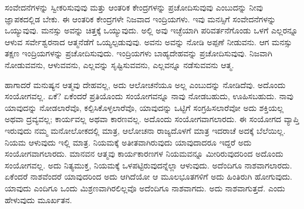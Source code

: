 ಸಂವೇದನೆಗಳನ್ನು ಸ್ವೀಕರಿಸುವುವು ಮತ್ತು ಆಂತರಿಕ ಕೇಂದ್ರಗಳನ್ನು ಪ್ರಚೋದಿಸುವುವು ಎಂಬುದನ್ನು ನೀವು ಜ್ಞಾಪಕದಲ್ಲಿಡ ಬೇಕು. ಈ ಆಂತರಿಕ ಕೇಂದ್ರಗಳೇ ನಿಜವಾದ ಇಂದ್ರಿಯಗಳು. ಇವು ಮನಸ್ಸಿಗೆ ಸಂವೇದನೆಗಳನ್ನು ಒಯ್ಯುವುವು. ಮನಸ್ಸು ಅವನ್ನು ಚಿತ್ತಕ್ಕೆ ಒಯ್ಯುವುದು. ಅಲ್ಲಿ ಅವು ಇಚ್ಛೆಯಾಗಿ ಪರಿವರ್ತನೆಗೊಂಡು ಒಳಗೆ ಎಲ್ಲರನ್ನೂ ಆಳುವ ಸರ್ವೇಶ್ವರನಾದ ಆತ್ಮನೆಡೆಗೆ ಒಯ್ಯಲ್ಪಡುವುವು. ಅವನು ಅವನ್ನು ನೋಡಿ ಅಪ್ಪಣೆ ನೀಡುವನು. ಆಗ ಮನಸ್ಸು ತಕ್ಷಣ ಇಂದ್ರಿಯಗಳನ್ನು ಪ್ರಚೋದಿಸುವುದು. ಇಂದ್ರಿಯಗಳು ಬಾಹ್ಯದೇಹವನ್ನು ಪ್ರಚೋದಿಸುವುವು. ನಿಜವಾಗಿ ನೋಡುವವನು, ಆಳುವವನು, ಎಲ್ಲವನ್ನು ಸೃಷ್ಟಿಸುವವನು, ಎಲ್ಲವನ್ನೂ ನಡೆಸುವವನು ಆತ್ಮ.

\vskip 0.2cm

ಹಾಗಾದರೆ ಮನುಷ್ಯನ ಆತ್ಮವು ದೇಹವಲ್ಲ, ಅದು ಆಲೋಚನೆಯೂ ಅಲ್ಲ ಎಂಬುದನ್ನು ನೋಡಿದೆವು. ಅದೊಂದು ಸಂಯೋಗವಲ್ಲ. ಏಕೆ? ಏಕೆಂದರೆ ಪ್ರತಿಯೊಂದು ಸಂಯೋಗವನ್ನೂ ನಾವು ನೋಡಬಹುದು, ಊಹಿಸಬಹುದು. ನಾವು ಯಾವುದನ್ನು ನೋಡಲಾರೆವೊ, ಕಲ್ಪಿಸಿಕೊಳ್ಳಲಾರೆವೊ, ಯಾವುದನ್ನು ಒಟ್ಟಿಗೆ ಸಂಗ್ರಹಿಸಲಾರೆವೋ ಅದು ಶಕ್ತಿಯಲ್ಲ ಅಥವಾ ದ್ರವ್ಯವಲ್ಲ; ಕಾರ್ಯವಲ್ಲ ಅಥವಾ ಕಾರಣವಲ್ಲ. ಅದೊಂದು ಸಂಯೋಗವಾಗಲಾರದು. ಈ ಸಂಯೋಗದ ವ್ಯಾಪ್ತಿ ಇರುವುದು ನಮ್ಮ ಮನೋಲೋಕದಲ್ಲಿ ಮಾತ್ರ, ಆಲೋಚನಾ ರಾಜ್ಯದೊಳಗೆ ಮಾತ್ರ ಇದರಾಚೆ ಅದಕ್ಕೆ ಬೆಲೆಯಿಲ್ಲ. ನಿಯಮ ಆಳುವುದು ಇಲ್ಲಿ ಮಾತ್ರ. ನಿಯಮಕ್ಕೆ ಅತೀತವಾಗಿರುವುದು ಯಾವುದಾದರೂ ಇದ್ದರೆ ಅದು ಸಂಯೋಗವಾಗಲಾರದು. ಮಾನವನ ಆತ್ಮವು ಕಾರ್ಯಕಾರಣಗಳ ನಿಯಮವನ್ನೂ ಮೀರಿರುವುದರಿಂದ ಅದೊಂದು ಸಂಯೋಗವಲ್ಲ. ಅದು ನಿತ್ಯಮುಕ್ತ, ನಿಯಮಕ್ಕೆ ಒಳಪಟ್ಟಿರುವುದನ್ನೆಲ್ಲಾ ಆಳುವುದು. ಅದೆಂದಿಗೂ ನಾಶವಾಗಲಾರದು. ಏಕೆಂದರೆ ನಾಶವೆಂದರೆ ಯಾವುದರಿಂದ ಅದು ಆಗಿದೆಯೋ ಆ ಮೂಲಭೂತಗಳಿಗೆ ಅದು ಹಿಂತಿರುಗಿ ಹೋಗುವುದು. ಯಾವುದು ಎಂದಿಗೂ ಒಂದು ಮಿಶ್ರಣವಾಗಿರಲಿಲ್ಲವೊ ಅದೆಂದಿಗೂ ನಾಶವಾಗದು. ಅದು ನಾಶವಾಗುತ್ತದೆ. ಎಂದು ಹೇಳುವುದು ಮೂರ್ಖತನ.

\vskip 0.2cm

